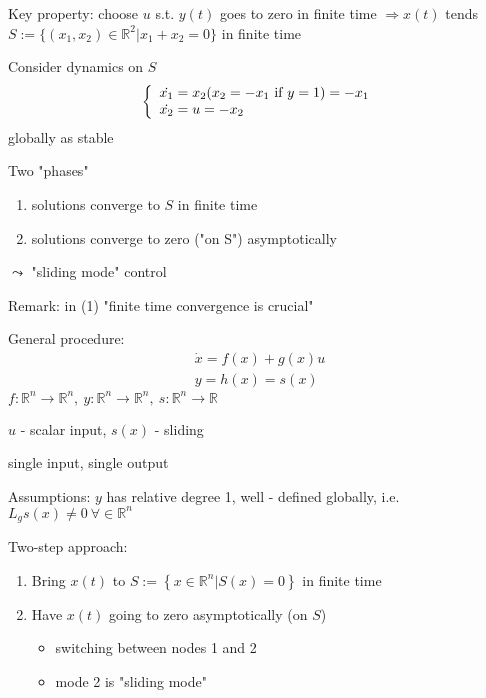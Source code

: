 
Key property: choose $u$ s.t. $y(t)$ goes to zero in finite time $\Rightarrow x(t)$ tends $S := \{ (x_1, x_2) \in \mathbb{R}^2 | x_1 +x_2 = 0 \}$ in finite time

Consider dynamics on $S$
\begin{equation*}
\left\{ \begin{array}{l}
                  \dot{x_1} = x_2 (x_2 = -x_1 \ $if$ \  y =1) = -x_1\\
                 \dot{x_2} = u = -x_2
                \end{array}
              \right. 
\end{equation*} 
globally as stable


Two "phases"
\begin{enumerate}
\item solutions converge to $S$ in finite time
\item solutions converge to zero ("on S") asymptotically
\end{enumerate}
$\leadsto $ "sliding mode" control

Remark: in (1) "finite time convergence is crucial"

General procedure:
\begin{equation*}
\begin{split}
\dot{x} = f(x)+g(x)u \\
y = h(x)= s(x)
\end{split}
\end{equation*}
$f: \mathbb{R}^n \to \mathbb{R}^n, \  y : \mathbb{R}^n \to \mathbb{R}^n, \ s: \mathbb{R}^n \to \mathbb{R}$

$u$ - scalar input, $s(x)$ - sliding

single input, single output 

Assumptions: $y$ has relative degree 1, well - defined globally, i.e. $L_gs(x) \neq 0 \ \forall \in \mathbb{R}^n$

Two-step approach:
\begin{enumerate}
\item Bring $x(t)$ to $S := \left \{ x \in \mathbb{R}^n | S(x) = 0 \right\}$ in finite time
\item Have $x(t)$ going to zero asymptotically (on $S$)
\begin{itemize}
\item switching between nodes 1 and 2
\item mode 2 is "sliding mode"
\end{itemize}
\end{enumerate} 

